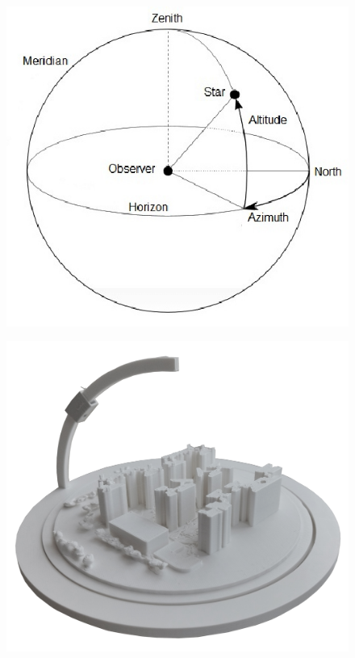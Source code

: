 \documentclass[a4paper,9pt]{article}
\begin{document}
      \begin{minipage}{0.48\linewidth}
         \begin{figure}[H]
        \centering
        \includegraphics[width=.6\linewidth]{Images/horizontal coord_1.jpg}
        \label{horizontalcoord}
    \end{figure}
    \end{minipage}
    \hfill
    \begin{minipage}{0.48\linewidth}
         \begin{figure}[H]
        \centering
        \includegraphics[width=.6\linewidth]{Images/prototyp hor2_1.png}
        \label{protohoriz}
    \end{figure}
    \end{minipage}
    \vspace{.5cm}
\end{document}
